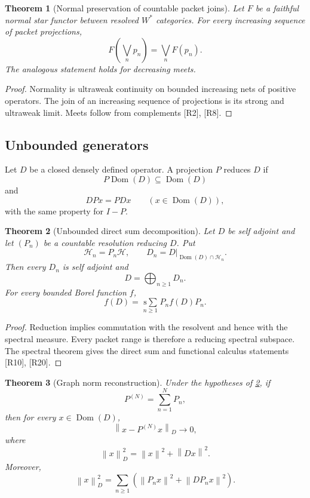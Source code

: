 \documentclass{aomart}
\newtheorem{theorem}{Theorem}[section]
\theoremstyle{definition}
\theoremstyle{remark}
\newcommand{\Hh}{\mathcal H}
\newcommand{\norm}[1]{\left\lVert#1\right\rVert}
\newcommand{\Rcite}[1]{\textup{[#1]}}
\begin{document}
\begin{theorem}[Normal preservation of countable packet joins]\label{thm:normal_joins}
Let \(F\) be a faithful normal star functor between resolved \(W^*\) categories. For every increasing sequence of packet projections,
\[
 F\left(\bigvee_np_n\right)
 =
 \bigvee_nF(p_n).
\]
The analogous statement holds for decreasing meets.
\end{theorem}

\begin{proof}
Normality is ultraweak continuity on bounded increasing nets of positive operators. The join of an increasing sequence of projections is its strong and ultraweak limit. Meets follow from complements \Rcite{R2}, \Rcite{R8}.
\end{proof}

\subsection{Unbounded generators}

\begin{definition}\label{def:unbounded_reduction}
Let \(D\) be a closed densely defined operator. A projection \(P\) reduces \(D\) if
\[
 P\operatorname{Dom}(D)\subseteq\operatorname{Dom}(D)
\]
and
\[
 DPx=PDx
 \qquad
 (x\in\operatorname{Dom}(D)),
\]
with the same property for \(I-P\).
\end{definition}

\begin{theorem}[Unbounded direct sum decomposition]\label{thm:unbounded_direct_sum}
Let \(D\) be self adjoint and let \((P_n)\) be a countable resolution reducing \(D\). Put
\[
 \Hh_n=P_n\Hh,
 \qquad
 D_n=D|_{\operatorname{Dom}(D)\cap\Hh_n}.
\]
Then every \(D_n\) is self adjoint and
\[
 \boxed{
 D=\bigoplus_{n\ge1}D_n.
 }
\]
For every bounded Borel function \(f\),
\[
 f(D)
 =
 \operatorname*{s\!\!\sum}_{n\ge1}
 P_nf(D)P_n.
\]
\end{theorem}

\begin{proof}
Reduction implies commutation with the resolvent and hence with the spectral measure. Every packet range is therefore a reducing spectral subspace. The spectral theorem gives the direct sum and functional calculus statements \Rcite{R10}, \Rcite{R20}.
\end{proof}

\begin{theorem}[Graph norm reconstruction]\label{thm:graph_norm}
Under the hypotheses of \cref{thm:unbounded_direct_sum}, if
\[
 P^{(N)}=\sum_{n=1}^{N}P_n,
\]
then for every \(x\in\operatorname{Dom}(D)\),
\[
 \norm{x-P^{(N)}x}_D\longrightarrow0,
\]
where
\[
 \norm{x}_D^2=\norm{x}^2+\norm{Dx}^2.
\]
Moreover,
\[
 \norm{x}_D^2
 =
 \sum_{n\ge1}
 \left(
 \norm{P_nx}^2+\norm{DP_nx}^2
 \right).
\]
\end{theorem}
\end{document}
